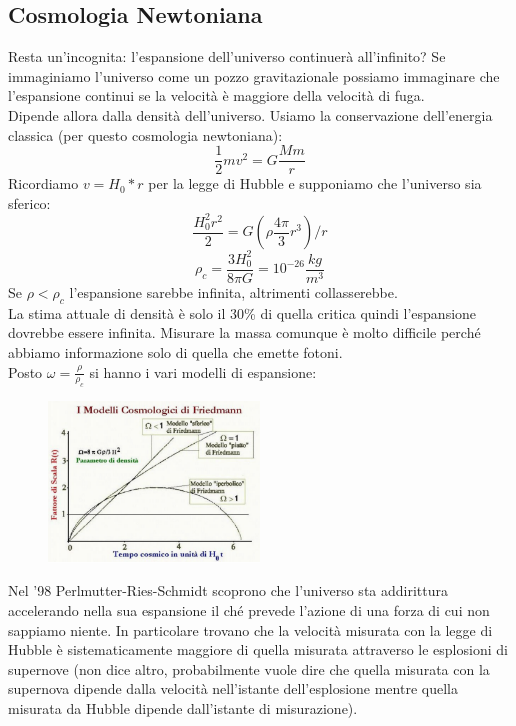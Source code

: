 \documentclass[a4paper,11pt]{article}
\begin{document}
\subsection{Cosmologia Newtoniana}
Resta un'incognita: l'espansione dell'universo continuerà all'infinito?
Se immaginiamo l'universo come un pozzo gravitazionale possiamo immaginare che l'espansione continui se la velocità è maggiore della velocità di fuga. \\
Dipende allora dalla densità dell'universo. Usiamo la conservazione dell'energia classica (per questo cosmologia newtoniana):
\begin{equation}
    \frac{1}{2}mv^2=G\frac{Mm}{r}
\end{equation}
Ricordiamo $v=H_0*r$ per la legge di Hubble e supponiamo che l'universo sia sferico:
\begin{equation}
    \frac{H_0^2r^2}{2}=G(\rho\frac{4\pi}{3}r^3)/r
\end{equation}
\begin{equation}
    \rho_c=\frac{3H_0^2}{8\pi G}=10^{-26}\frac{kg}{m^3}
\end{equation}
Se $\rho<\rho_c$ l'espansione sarebbe infinita, altrimenti collasserebbe.\\
La stima attuale di densità è solo il 30\% di quella critica quindi l'espansione dovrebbe essere infinita. Misurare la massa comunque è molto difficile perché abbiamo informazione solo di quella che emette fotoni.\\
Posto $\omega=\frac{\rho}{\rho_c}$ si hanno i vari modelli di espansione:
\begin{figure}[h!!]
        \centering
        \includegraphics[width=0.5\textwidth]{immagini16dic/cosmodelli.png}
        \label{}
    \end{figure}
 \newline
Nel '98 Perlmutter-Ries-Schmidt scoprono che l'universo sta addirittura accelerando nella sua espansione il ché prevede l'azione di una forza di cui non sappiamo niente. In particolare trovano che la velocità misurata con la legge di Hubble è sistematicamente maggiore di quella misurata attraverso le esplosioni di supernove (non dice altro, probabilmente vuole dire che quella misurata con la supernova dipende dalla velocità nell'istante dell'esplosione mentre quella misurata da Hubble dipende dall'istante di misurazione).\\
\end{document}
